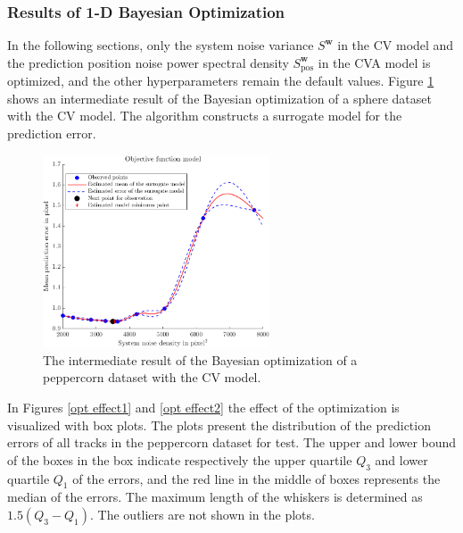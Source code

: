

\subsubsection{Results of 1-D Bayesian Optimization}

In the following sections, only the system noise variance $S^{\boldsymbol{w}}$ in the CV model and the prediction position noise power spectral density $S_{\mathrm{pos}}^{\boldsymbol{w}}$ in the CVA model is optimized, and the other hyperparameters remain the default values. Figure \ref{opt cv sph} shows an intermediate result of the Bayesian optimization of a sphere dataset with the CV model. The algorithm constructs a surrogate model for the prediction error.

\begin{figure}[htbp]
\centering
\includegraphics[width=0.6\textwidth]{figures/KF/bayopt/bayopt line pfeffer.png}
\caption{The intermediate result of the Bayesian optimization of a peppercorn dataset with the CV model.}
\label{opt cv sph}
\end{figure}

In Figures \ref{opt effect1} and \ref{opt effect2} the effect of the optimization is visualized with box plots. The plots present the distribution of the prediction errors of all tracks in the peppercorn dataset for test. The upper and lower bound of the boxes in the box indicate respectively the upper quartile $Q_{3}$ and lower quartile $Q_{1}$ of the errors, and the red line in the middle of boxes represents the median of the errors. The maximum length of the whiskers is determined as $1.5(Q_{3}-Q_{1})$. The outliers are not shown in the plots.


